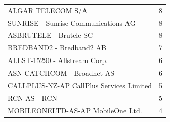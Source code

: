 \begin{table}[!h]
\begin{tabular}{lp{2cm}}
		ALGAR TELECOM S/A                                &                                  8 \\
		SUNRISE - Sunrise Communications AG              &                                  8 \\
		ASBRUTELE - Brutele SC                           &                                  8 \\
		BREDBAND2 - Bredband2 AB                         &                                  7 \\
		ALLST-15290 - Allstream Corp.                    &                                  6 \\
		ASN-CATCHCOM - Broadnet AS                       &                                  6 \\
		CALLPLUS-NZ-AP CallPlus Services Limited          &                                 5 \\
		RCN-AS - RCN                                        &                               5 \\
		MOBILEONELTD-AS-AP MobileOne Ltd.   &     4 \\
		\bottomrule
\end{tabular}
\end{table}


